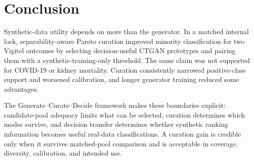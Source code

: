 \section{Conclusion}
\label{sec:conclusion}

Synthetic-data utility depends on more than the generator. In a matched internal lock, separability-aware Pareto curation improved minority classification for two Vigitel outcomes by selecting decision-useful CTGAN prototypes and pairing them with a synthetic-training-only threshold. The same claim was not supported for COVID-19 or kidney mortality. Curation consistently narrowed positive-class support and worsened calibration, and longer generator training reduced some advantages.

The Generate--Curate--Decide framework makes these boundaries explicit: candidate-pool adequacy limits what can be selected, curation determines which modes survive, and decision transfer determines whether synthetic ranking information becomes useful real-data classifications. A curation gain is credible only when it survives matched-pool comparison and is acceptable in coverage, diversity, calibration, and intended use.
